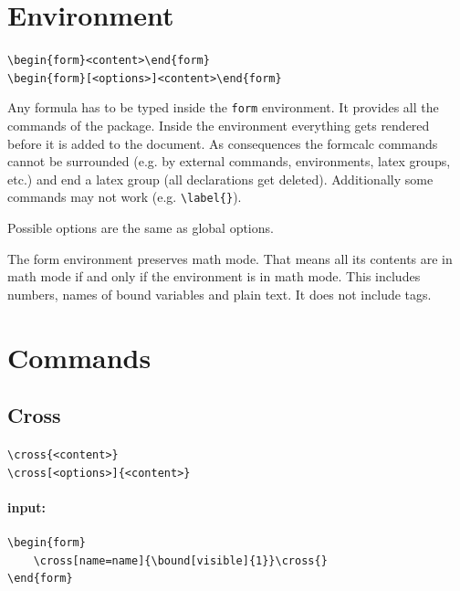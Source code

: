 \documentclass[parskip=half-]{scrartcl}
\begin{document}
\section{Environment}

\begin{framed}
\verb|\begin{form}<content>\end{form}|\\
\verb|\begin{form}[<options>]<content>\end{form}|
\end{framed}


Any formula has to be typed inside the \verb|form| environment. It provides all the commands of the package. Inside the environment everything gets rendered before it is added to the document. As consequences the formcalc commands cannot be surrounded (e.g. by external commands, environments, latex groups, etc.) and end a latex group (all declarations get deleted). Additionally some commands may not work (e.g. \verb|\label{}|).

Possible options are the same as global options.

The form environment preserves math mode. That means all its contents are in math mode if and only if the environment is in math mode. This includes numbers, names of bound variables and plain text. It does not include tags.

\section{Commands}

\subsection{Cross}
\label{com:cross}

\begin{framed}
\verb|\cross{<content>}|\\
\verb|\cross[<options>]{<content>}|
\end{framed}

\paragraph{input:}
\begin{verbatim}
\begin{form}
    \cross[name=name]{\bound[visible]{1}}\cross{}
\end{form}
\end{verbatim}
\end{document}
